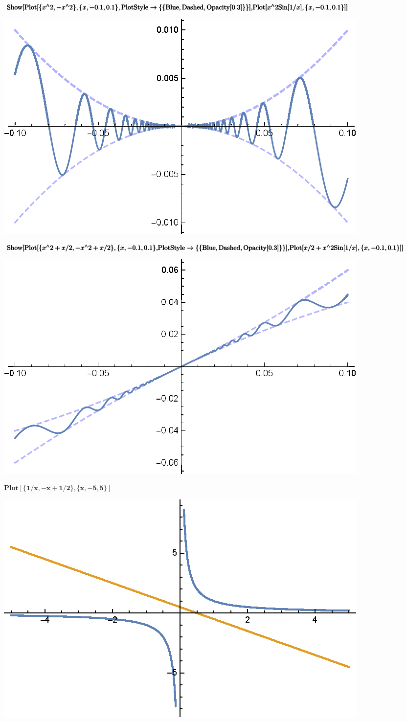 \documentclass{article}
\begin{document}
\begin{doublespace}
\noindent\(\pmb{\text{Show}[\text{Plot}[\{x{}^{\wedge}2,-x{}^{\wedge}2\}, \{x, -0.1, 0.1\}, \text{PlotStyle} \to  \{\{\text{Blue}, \text{Dashed},
\text{Opacity} [0.3]\}\}],}\\
\pmb{\text{Plot}[x{}^{\wedge}2\text{Sin}[1/x], \{x, -0.1, 0.1\}]]}\)
\end{doublespace}

\includegraphics{plots_gr1.eps}

\begin{doublespace}
\noindent\(\pmb{\text{Show}[\text{Plot}[\{x{}^{\wedge}2 + x/2,-x{}^{\wedge}2 + x/2\}, \{x, -0.1, 0.1\}, }\\
\pmb{\text{PlotStyle} \to  \{\{\text{Blue}, \text{Dashed}, \text{Opacity} [0.3]\}\}],}\\
\pmb{\text{Plot}[x/2 + x{}^{\wedge}2\text{Sin}[1/x], \{x, -0.1, 0.1\}]]}\)
\end{doublespace}

\includegraphics{plots_gr2.eps}

\begin{doublespace}
\noindent\(\pmb{\text{Plot}[\{1/x, -x + 1/2\}, \{x, -5, 5\}]}\)
\end{doublespace}

\includegraphics{plots_gr3.eps}
\end{document}
